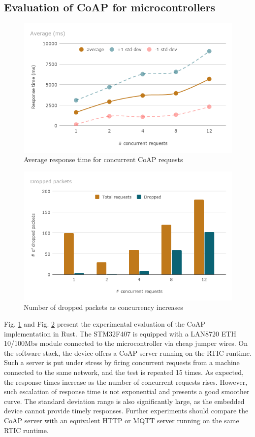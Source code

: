 \subsection{Evaluation of CoAP for microcontrollers}

\begin{figure}[ht]
\centering
\includegraphics[width=\columnwidth]{figures/b-coap-1}
\caption{Average response time for concurrent CoAP requests \label{fig:b-coap-1}}
\end{figure}

\begin{figure}[ht]
\centering
\includegraphics[width=\columnwidth]{figures/b-coap-2}
\caption{Number of dropped packets as concurrency increases \label{fig:b-coap-2}}
\end{figure}

Fig. \ref{fig:b-coap-1} and Fig. \ref{fig:b-coap-2} present the experimental evaluation of the CoAP implementation in Rust. The STM32F407 is equipped with a LAN8720 ETH 10/100Mbs module connected to the microcontroller via cheap jumper wires. On the software stack, the device offers a CoAP server running on the RTIC runtime. Such a server is put under stress by firing concurrent requests from a machine connected to the same network, and the test is repeated 15 times. As expected, the response times increase as the number of concurrent requests rises. However, such escalation of response time is not exponential and presents a good smoother curve. The standard deviation range is also significantly large, as the embedded device cannot provide timely responses. Further experiments should compare the CoAP server with an equivalent HTTP or MQTT server running on the same RTIC runtime.

